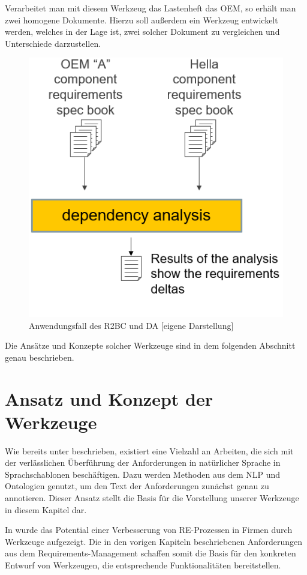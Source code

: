 \documentclass[12pt]{report}
\begin{document}
Verarbeitet man mit diesem Werkzeug das Lastenheft das OEM, so erhält man zwei homogene Dokumente. Hierzu soll außerdem ein Werkzeug entwickelt werden, welches in der Lage ist, zwei solcher Dokument zu vergleichen und Unterschiede darzustellen.

\begin{figure}[H]
\begin{center}
\includegraphics[scale=0.9]{Bilder/Use-Case.png}
\caption{Anwendungsfall des R2BC und DA [eigene Darstellung]}
\end{center}
\end{figure}

Die Ansätze und Konzepte solcher Werkzeuge sind in dem folgenden Abschnitt genau beschrieben.

\section[Ansatz und Konzept]{Ansatz und Konzept der Werkzeuge}
Wie bereits unter beschrieben, existiert eine Vielzahl an Arbeiten, die sich mit der verlässlichen Überführung der Anforderungen in natürlicher Sprache in Sprachschablonen beschäftigen. Dazu werden Methoden aus dem NLP und Ontologien genutzt, um den Text der Anforderungen zunächst genau zu annotieren. Dieser Ansatz stellt die Basis für die Vorstellung unserer Werkzeuge in diesem Kapitel dar.

In \cite{zh17} wurde das Potential einer Verbesserung von RE-Prozessen in Firmen durch Werkzeuge aufgezeigt. Die in den vorigen Kapiteln beschriebenen Anforderungen aus dem Requirements-Management schaffen somit die Basis für den konkreten Entwurf von Werkzeugen, die entsprechende Funktionalitäten bereitstellen.
\end{document}
